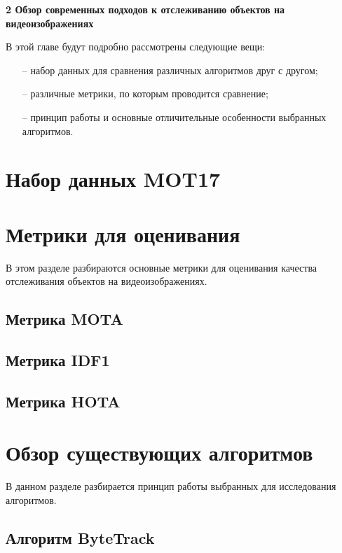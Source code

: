 \newpage
\begin{flushleft}
  \textbf{\large 2 Обзор современных подходов к отслеживанию объектов на видеоизображениях}
\end{flushleft}
В этой главе будут подробно рассмотрены следующие вещи:
\begin{itemize}
  \item[--] набор данных для сравнения различных алгоритмов друг с другом;
  \item[--] различные метрики, по которым проводится сравнение;
  \item[--] принцип работы и основные отличительные особенности выбранных алгоритмов. 
\end{itemize}
\section{Набор данных MOT17}

\section{Метрики для оценивания}
В этом разделе разбираются основные метрики для оценивания качества отслеживания объектов на видеоизображениях.
\subsection{Метрика MOTA}

\subsection{Метрика IDF1}

\subsection{Метрика HOTA}


\section{Обзор существующих алгоритмов}
В данном разделе разбирается принцип работы выбранных для исследования алгоритмов.
\subsection{Алгоритм ByteTrack}


